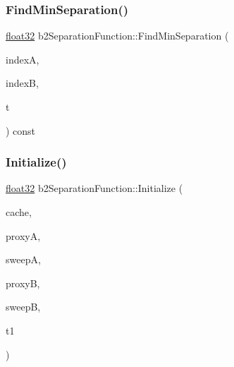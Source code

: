 \mbox{\label{structb2_separation_function_ac0a603a96343be37d0a0bdf852be1e77}} 
\subsubsection{\texorpdfstring{FindMinSeparation()}{FindMinSeparation()}}
{\footnotesize\ttfamily \mbox{\hyperlink{b2_settings_8h_aacdc525d6f7bddb3ae95d5c311bd06a1}{float32}} b2\+Separation\+Function\+::\+Find\+Min\+Separation (\begin{DoxyParamCaption}\item[{\mbox{\hyperlink{b2_settings_8h_a43d43196463bde49cb067f5c20ab8481}{int32}} $\ast$}]{indexA,  }\item[{\mbox{\hyperlink{b2_settings_8h_a43d43196463bde49cb067f5c20ab8481}{int32}} $\ast$}]{indexB,  }\item[{\mbox{\hyperlink{b2_settings_8h_aacdc525d6f7bddb3ae95d5c311bd06a1}{float32}}}]{t }\end{DoxyParamCaption}) const\hspace{0.3cm}{\ttfamily [inline]}}

\mbox{\label{structb2_separation_function_acfe0bb0d85a5001f1e957eea2137e039}} 
\subsubsection{\texorpdfstring{Initialize()}{Initialize()}}
{\footnotesize\ttfamily \mbox{\hyperlink{b2_settings_8h_aacdc525d6f7bddb3ae95d5c311bd06a1}{float32}} b2\+Separation\+Function\+::\+Initialize (\begin{DoxyParamCaption}\item[{const \mbox{\hyperlink{structb2_simplex_cache}{b2\+Simplex\+Cache}} $\ast$}]{cache,  }\item[{const \mbox{\hyperlink{structb2_distance_proxy}{b2\+Distance\+Proxy}} $\ast$}]{proxyA,  }\item[{const \mbox{\hyperlink{structb2_sweep}{b2\+Sweep}} \&}]{sweepA,  }\item[{const \mbox{\hyperlink{structb2_distance_proxy}{b2\+Distance\+Proxy}} $\ast$}]{proxyB,  }\item[{const \mbox{\hyperlink{structb2_sweep}{b2\+Sweep}} \&}]{sweepB,  }\item[{\mbox{\hyperlink{b2_settings_8h_aacdc525d6f7bddb3ae95d5c311bd06a1}{float32}}}]{t1 }\end{DoxyParamCaption})\hspace{0.3cm}{\ttfamily [inline]}}




